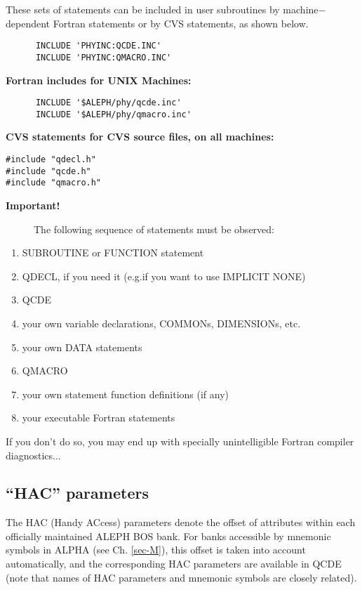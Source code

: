 These sets of statements can be included in user subroutines
by machine$-$dependent
Fortran statements or by CVS statements, as shown below.
\par
{}
\begin{verbatim}
      INCLUDE 'PHYINC:QCDE.INC'
      INCLUDE 'PHYINC:QMACRO.INC'
\end{verbatim}
{\bf Fortran includes for UNIX Machines:}
\begin{verbatim}
      INCLUDE '$ALEPH/phy/qcde.inc'
      INCLUDE '$ALEPH/phy/qmacro.inc'
\end{verbatim}
{\bf CVS statements for CVS source files, on all machines:}
\begin{verbatim}
#include "qdecl.h"
#include "qcde.h"
#include "qmacro.h"
\end{verbatim}
\begin{description}\item[\bf{Important!
}]The following sequence of statements must be observed:\end{description}
\begin{enumerate}
\item SUBROUTINE or FUNCTION statement
\item QDECL, if you need it (e.g.if you want to use IMPLICIT NONE)
\item QCDE 
\item your own variable declarations, COMMONs, DIMENSIONs, etc.
\item your own DATA statements
\item QMACRO
\item your own statement function definitions (if any)
\item your executable Fortran statements
\end{enumerate}
If you don't do so, you may end up with specially unintelligible Fortran compiler 
diagnostics...

\par
\subsection{\label{sec-UHAC}``HAC'' parameters}
\par
The HAC (Handy ACcess)
parameters denote the offset of attributes within each officially maintained ALEPH BOS bank.
For banks accessible by mnemonic symbols in ALPHA (see Ch.
\ref{sec-M}), this offset
is taken into account automatically, and the corresponding HAC
parameters are available in QCDE (note that names of HAC parameters
and mnemonic symbols are closely related).
 
